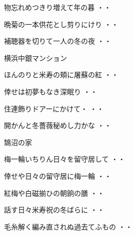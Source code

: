 \begin{shiika}物忘れめつきり増えて年の暮
\hfill{・・}\end{shiika}
\begin{shiika}晩菊の一本供花とし剪りにけり
\hfill{・・}\end{shiika}
\begin{shiika}補聴器を切りて一人の冬の夜
\hfill{・・}\end{shiika}
\vspace{0.4cm}
横浜中銀マンション
\begin{shiika}ほんのりと米寿の頬に屠蘇の紅
\hfill{・・}\end{shiika}
\begin{shiika}倖せは初夢もなき深眠り
\hfill{・・}\end{shiika}
\begin{shiika}住連飾りドアーにかけて・
\hfill{・・}\end{shiika}
\begin{shiika}開かんと冬薔薇秘めし力かな
\hfill{・・}\end{shiika}
\vspace{0.4cm}
鵠沼の家
\begin{shiika}梅一輪いちりん日々を留守居して
\hfill{・・}\end{shiika}
\vspace{0.4cm}
\begin{shiika}倖せや日々の留守居に梅一輪
\hfill{・・}\end{shiika}
\vspace{0.4cm}
\begin{shiika}紅梅や白磁揃ひの朝餉の膳
\hfill{・・}\end{shiika}
\vspace{0.4cm}
\begin{shiika}話す日々米寿祝の冬ばらに
\hfill{・・}\end{shiika}
\vspace{0.4cm}
\begin{shiika}毛糸解く編み直されぬ過去てふもの
\hfill{・・}\end{shiika}
\vspace{0.4cm}
